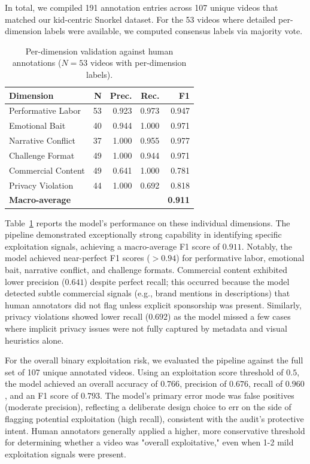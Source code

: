 \documentclass[]{ieeeaccess}
\begin{document}
In total, we compiled 191 annotation entries across 107 unique videos that matched our kid-centric Snorkel dataset. For the 53 videos where detailed per-dimension labels were available, we computed consensus labels via majority vote. 
\begin{table}[t]
\centering
\begin{tabular}{lrrrr}
\toprule
\textbf{Dimension} & \textbf{N} & \textbf{Prec.} & \textbf{Rec.} & \textbf{F1} \\
\midrule
Performative Labor & 53 & 0.923 & 0.973 & 0.947 \\
Emotional Bait & 40 & 0.944 & 1.000 & 0.971 \\
Narrative Conflict & 37 & 1.000 & 0.955 & 0.977 \\
Challenge Format & 49 & 1.000 & 0.944 & 0.971 \\
Commercial Content & 49 & 0.641 & 1.000 & 0.781 \\
Privacy Violation & 44 & 1.000 & 0.692 & 0.818 \\
\midrule
\textbf{Macro-average} & & & & \textbf{0.911} \\
\bottomrule
\end{tabular}
\caption{Per-dimension validation against human annotations ($N=53$ videos with per-dimension labels).}
\label{tab:validation_dims}
\end{table}

Table~\ref{tab:validation_dims} reports the model's performance on these individual dimensions. The pipeline demonstrated exceptionally strong capability in identifying specific exploitation signals, achieving a macro-average F1 score of $0.911$. Notably, the model achieved near-perfect F1 scores ($>0.94$) for performative labor, emotional bait, narrative conflict, and challenge formats. Commercial content exhibited lower precision ($0.641$) despite perfect recall; this occurred because the model detected subtle commercial signals (e.g., brand mentions in descriptions) that human annotators did not flag unless explicit sponsorship was present. Similarly, privacy violations showed lower recall ($0.692$) as the model missed a few cases where implicit privacy issues were not fully captured by metadata and visual heuristics alone.

For the overall binary exploitation risk, we evaluated the pipeline against the full set of 107 unique annotated videos. Using an exploitation score threshold of $0.5$, the model achieved an overall accuracy of $0.766$, precision of $0.676$, recall of $0.960$, and an F1 score of $0.793$. The model's primary error mode was false positives (moderate precision), reflecting a deliberate design choice to err on the side of flagging potential exploitation (high recall), consistent with the audit's protective intent. Human annotators generally applied a higher, more conservative threshold for determining whether a video was "overall exploitative," even when 1-2 mild exploitation signals were present.
\end{document}
